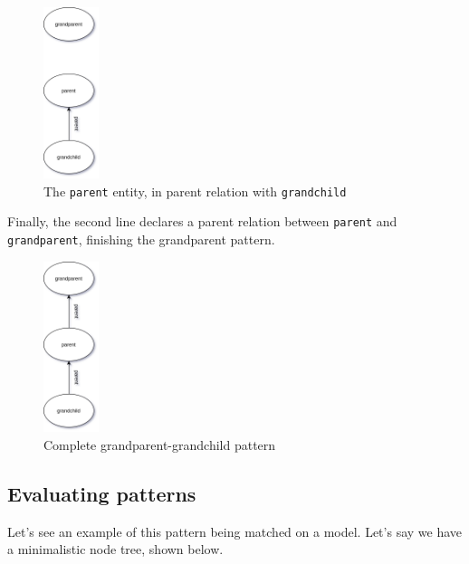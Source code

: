 \documentclass[11pt,a4paper,oneside]{report}
\begin{document}
\begin{figure}[!htbp]
\centering
\includegraphics[height=50mm, keepaspectratio]{figures/basic-pattern-explanation-2.png}
\caption{The \texttt{parent} entity, in parent relation with \texttt{grandchild}}
\label{fig:basic-pattern-explanation-2}
\end{figure}

Finally, the second line declares a parent relation between \texttt{parent} and
\texttt{grandparent}, finishing the grandparent pattern.

\begin{figure}[!htbp]
\centering
\includegraphics[height=50mm, keepaspectratio]{figures/basic-pattern-explanation-3.png}
\caption{Complete grandparent-grandchild pattern}
\label{fig:basic-pattern-explanation-3}
\end{figure}

\subsection{Evaluating patterns}
Let's see an example of this pattern being matched on a model. Let's say we have
a minimalistic node tree, shown below.
\end{document}
